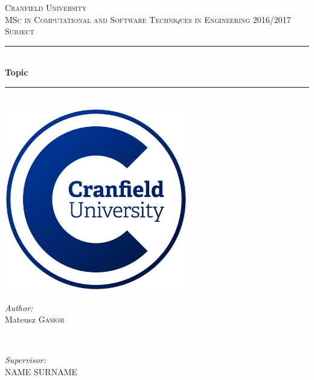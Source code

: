\documentclass[a4paper]{article}
\begin{document}
	
	\begin{titlepage}
		\newcommand{\HRule}{\rule{\linewidth}{0.5mm}}
		
		\center
		
		\textsc{\LARGE Cranfield University}\\[1.5cm]
		\textsc{\Large MSc in Computational and Software Techniques in Engineering 2016/2017}\\[0.5cm]
		\textsc{\large Subject}\\[0.5cm]
		
		\HRule \\[0.4cm]
		{ \huge \bfseries Topic}\\[0.4cm]
		\HRule \\[1.5cm]
		
		\includegraphics[width=8cm]{img/cranfield-logo}\\[1cm]
		
		\vfill
		\begin{minipage}{0.4\textwidth}
			\begin{flushleft} \large
				\emph{Author:}\\
				Mateusz \textsc{Gasior}
			\end{flushleft}
		\end{minipage}
		~
		\begin{minipage}{0.4\textwidth}
			\begin{flushright} \large
				\emph{Supervisor:} \\
				NAME \textsc{SURNAME}
			\end{flushright}
		\end{minipage}\\[2cm]
		

\end{titlepage}
\end{document}
